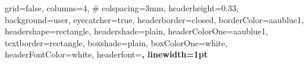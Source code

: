 \documentclass[Junlampaper, portrait]{Junlam_PosterK}
\begin{document}

\begin{poster}{
  grid=false,
  columns=4, #
  colspacing=3mm,
  headerheight=0.33\textheight,
  background=user,
  eyecatcher=true,
  headerborder=closed,
  borderColor=aaublue1,
  headershape=rectangle,
  headershade=plain,
  headerColorOne=aaublue1,
  textborder=rectangle,
  boxshade=plain,
  boxColorOne=white,
  headerFontColor=white,
  headerfont=\Large\sf\bf,
  linewidth=1pt
}

{
}
{
}




\end{poster}
\end{document}
